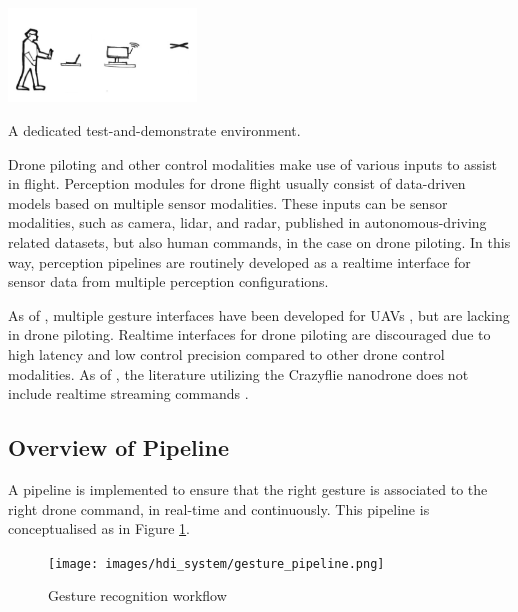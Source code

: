 
\begin{marginfigure}%
  \includegraphics[width=5cm]{images/intro/step2_diagram.png}
  \caption{A dedicated test-and-demonstrate environment.}
  \label{fig:testbed}
\end{marginfigure}

Drone piloting and other control modalities \cite{tezza_andujar_2019} make use of various inputs to assist in flight. Perception modules for drone flight usually consist of data-driven models based on multiple sensor modalities. These inputs can be sensor modalities, such as camera, lidar, and radar, published in autonomous-driving related datasets, but also human commands, in the case on drone piloting. In this way, perception pipelines are routinely developed as a realtime interface for sensor data from multiple perception configurations. 

As of , multiple gesture interfaces have been developed for UAVs \cite{liu_szirányi_2021} \cite{gesture_interface}, but are lacking in drone piloting. Realtime interfaces for drone piloting are discouraged \cite{tezza_andujar_2019} due to high latency and low control precision compared to other drone control modalities. As of , the literature utilizing the Crazyflie nanodrone does not include realtime streaming commands \cite{crazyflie_research}. 

\subsection{Overview of Pipeline}

A pipeline is implemented to ensure that the right gesture is associated to the right drone command, in real-time and continuously. This pipeline is conceptualised as in Figure \ref{fig:handpipeline}.

\begin{figure}[h]
  \raggedright
  \texttt{[image: images/hdi\_system/gesture\_pipeline.png]}
  \caption{Gesture recognition workflow}
  \label{fig:handpipeline}
\end{figure}

